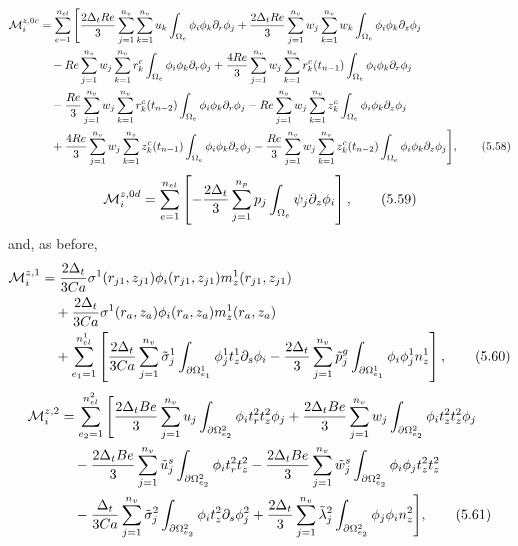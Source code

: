 \documentclass{article}
\begin{document}
\begin{align}
\mathcal{M}_i^{z,0c} &= \sum_{e=1}^{n_{el}} \Bigg[ \frac{2\Delta_t Re}{3} \sum_{j=1}^{n_v} \sum_{k=1}^{n_v} u_k \int_{\Omega_e} \phi_i \phi_k \partial_r \phi_j + \frac{2\Delta_t Re}{3} \sum_{j=1}^{n_v} w_j \sum_{k=1}^{n_v} w_k \int_{\Omega_e} \phi_i \phi_k \partial_z \phi_j \nonumber\\
&\quad - Re \sum_{j=1}^{n_v} w_j \sum_{k=1}^{n_v} r_k^c \int_{\Omega_e} \phi_i \phi_k \partial_r \phi_j + \frac{4Re}{3} \sum_{j=1}^{n_v} w_j \sum_{k=1}^{n_v} r_k^c(t_{n-1}) \int_{\Omega_e} \phi_i \phi_k \partial_r \phi_j \nonumber\\
&\quad - \frac{Re}{3} \sum_{j=1}^{n_v} w_j \sum_{k=1}^{n_v} r_k^c(t_{n-2}) \int_{\Omega_e} \phi_i \phi_k \partial_r \phi_j - Re \sum_{j=1}^{n_v} w_j \sum_{k=1}^{n_v} z_k^c \int_{\Omega_e} \phi_i \phi_k \partial_z \phi_j \nonumber\\
&\quad + \frac{4Re}{3} \sum_{j=1}^{n_v} w_j \sum_{k=1}^{n_v} z_k^c(t_{n-1}) \int_{\Omega_e} \phi_i \phi_k \partial_z \phi_j - \frac{Re}{3} \sum_{j=1}^{n_v} w_j \sum_{k=1}^{n_v} z_k^c(t_{n-2}) \int_{\Omega_e} \phi_i \phi_k \partial_z \phi_j \Bigg], \tag{5.58}
\end{align}
\begin{equation}
\mathcal{M}_i^{z,0d} = \sum_{e=1}^{n_{el}} \left[ -\frac{2\Delta_t}{3} \sum_{j=1}^{n_p} p_j \int_{\Omega_e} \psi_j \partial_z \phi_i \right], \tag{5.59}
\end{equation}
and, as before,
\begin{align}
\mathcal{M}_i^{z,1} &= \frac{2\Delta_t}{3Ca} \sigma^1(r_{j1},z_{j1}) \phi_i(r_{j1},z_{j1}) m_z^{1}(r_{j1},z_{j1}) \nonumber\\
&\quad + \frac{2\Delta_t}{3Ca} \sigma^1(r_a,z_a) \phi_i(r_a,z_a) m_z^{1}(r_a,z_a) \nonumber\\
&\quad + \sum_{e_1=1}^{n_{el}^1} \left[ \frac{2\Delta_t}{3Ca} \sum_{j=1}^{n_v} \tilde{\sigma}_j^1 \int_{\partial \Omega_{e_1}^1} \phi_j^1 t_z^1 \partial_s \phi_i - \frac{2\Delta_t}{3} \sum_{j=1}^{n_v} \tilde{p}_j^g \int_{\partial \Omega_{e_1}^1} \phi_i \phi_j^1 n_z^1 \right], \tag{5.60}
\end{align}
\begin{align}
\mathcal{M}_i^{z,2} &= \sum_{e_2=1}^{n_{el}^2} \Bigg[ \frac{2\Delta_t Be}{3} \sum_{j=1}^{n_v} u_j \int_{\partial \Omega_{e_2}^2} \phi_i t_r^2 t_z^2 \phi_j + \frac{2\Delta_t Be}{3} \sum_{j=1}^{n_v} w_j \int_{\partial \Omega_{e_2}^2} \phi_i t_z^2 t_z^2 \phi_j \nonumber\\
&\quad - \frac{2\Delta_t Be}{3} \sum_{j=1}^{n_v} \tilde{u}_j^s \int_{\partial \Omega_{e_2}^2} \phi_i t_r^2 t_z^2 - \frac{2\Delta_t Be}{3} \sum_{j=1}^{n_v} \tilde{w}_j^s \int_{\partial \Omega_{e_2}^2} \phi_i \phi_j t_z^2 t_z^2 \nonumber\\
&\quad - \frac{\Delta_t}{3Ca} \sum_{j=1}^{n_v} \tilde{\sigma}_j^2 \int_{\partial \Omega_{e_2}^2} \phi_i t_z^2 \partial_s \phi_j^2 + \frac{2\Delta_t}{3} \sum_{j=1}^{n_v} \tilde{\lambda}_j^2 \int_{\partial \Omega_{e_2}^2} \phi_j \phi_i n_z^2 \Bigg], \tag{5.61}
\end{align}
\end{document}
